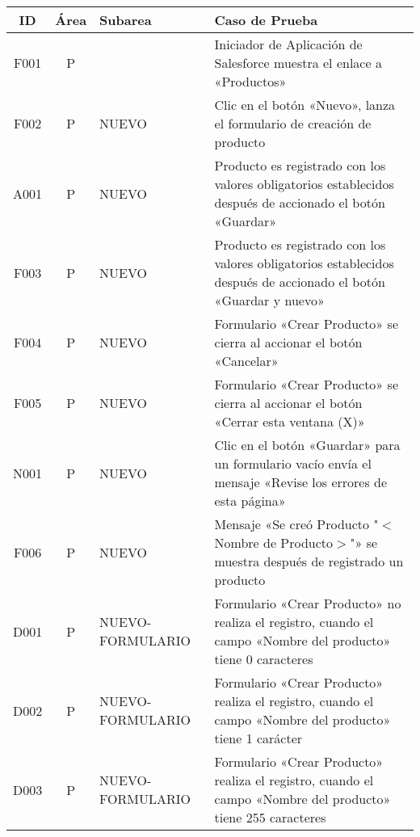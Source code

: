 \begin{landscape}
\centering
\small
{\def\arraystretch{1}
\begin{longtable}[htb]{|c|c|p{3.8cm}|p{15.2cm}|}
\hline
\scriptsize{\textbf{ID}} & \scriptsize{\textbf{Área}} &
\scriptsize{\textbf{Subarea}} & \scriptsize{\textbf{Caso de Prueba}} \\
\hline
\scriptsize{F001} & \scriptsize{P} & & \scriptsize{Iniciador de Aplicación de Salesforce muestra el enlace a «Productos»} \\ \hline
\scriptsize{F002} & \scriptsize{P} & \scriptsize{NUEVO} & \scriptsize{Clic en el botón «Nuevo», lanza el formulario de creación de producto} \\ \hline
\scriptsize{A001} & \scriptsize{P} & \scriptsize{NUEVO} & \scriptsize{Producto es registrado con los valores obligatorios establecidos después de accionado el botón «Guardar»} \\ \hline
\scriptsize{F003} & \scriptsize{P} & \scriptsize{NUEVO} & \scriptsize{Producto es registrado con los valores obligatorios establecidos después de accionado el botón «Guardar y nuevo»} \\ \hline
\scriptsize{F004} & \scriptsize{P} & \scriptsize{NUEVO} & \scriptsize{Formulario «Crear Producto» se cierra al accionar el botón «Cancelar»} \\ \hline
\scriptsize{F005} & \scriptsize{P} & \scriptsize{NUEVO} & \scriptsize{Formulario «Crear Producto» se cierra al accionar el botón «Cerrar esta ventana (X)»} \\ \hline
\scriptsize{N001} & \scriptsize{P} & \scriptsize{NUEVO} & \scriptsize{Clic en el botón «Guardar» para un formulario vacío envía el mensaje «Revise los errores de esta página»} \\ \hline
\scriptsize{F006} & \scriptsize{P} & \scriptsize{NUEVO} & \scriptsize{Mensaje «Se creó Producto "$<$Nombre de Producto$>$"» se muestra después de registrado un producto} \\ \hline
\scriptsize{D001} & \scriptsize{P} & \scriptsize{NUEVO-FORMULARIO} & \scriptsize{Formulario «Crear Producto» no realiza el registro, cuando el campo «Nombre del producto» tiene 0 caracteres} \\ \hline
\scriptsize{D002} & \scriptsize{P} & \scriptsize{NUEVO-FORMULARIO} & \scriptsize{Formulario «Crear Producto» realiza el registro, cuando el campo «Nombre del producto» tiene 1 carácter} \\ \hline
\scriptsize{D003} & \scriptsize{P} & \scriptsize{NUEVO-FORMULARIO} & \scriptsize{Formulario «Crear Producto» realiza el registro, cuando el campo «Nombre del producto» tiene 255 caracteres} \\ \hline

\end{longtable}}
\end{landscape}
